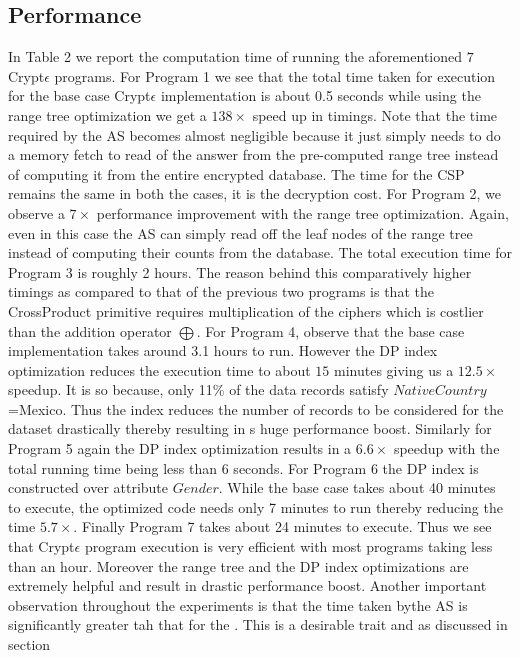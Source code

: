 \subsection{Performance}
In Table 2 we report the computation time of running the aforementioned $7$ Crypt$\epsilon$ programs. For Program 1 we see that the total time taken for execution for the base case Crypt$\epsilon$ implementation is about 0.5 seconds while using the range tree optimization we get a $138\times$ speed up in timings. Note that the time required by the \textsf{AS} becomes almost negligible because it just simply needs to do a memory fetch to read of the answer from the pre-computed range tree instead of computing it from the entire encrypted database. The time for the \textsf{CSP} remains the same in both the cases, it is the decryption cost. For Program 2, we observe a $7\times$ performance improvement with the range tree optimization. Again, even in this case the \textsf{AS} can simply read off the leaf nodes of the range tree instead of computing their counts from the database. The total execution time for Program 3 is roughly 2 hours.  The reason behind this comparatively higher timings as compared to that of the previous two programs is that the \textsf{CrossProduct} primitive requires  multiplication of the ciphers  which is costlier than the addition operator $\bigoplus$. For Program 4, observe that the base case implementation takes around 3.1 hours to run. However the DP index optimization reduces the execution time to about $15$ minutes  giving us a $12.5\times $ speedup. It is so because, only 11\% of the data records satisfy $NativeCountry$=Mexico. Thus the index reduces the number of records to be considered for the dataset drastically thereby resulting in s huge performance boost. Similarly for Program 5 again the DP index optimization results in a $6.6\times$ speedup with the total running time being less than 6 seconds. For Program 6 the DP index is constructed over attribute $Gender$. While the base case takes about 40 minutes to execute, the optimized code needs only 7 minutes to run thereby reducing the time  $5.7\times$. Finally Program 7 takes about 24 minutes to execute. Thus we see that Crypt$\epsilon$ program execution is very efficient with most programs taking less than an hour. Moreover the range tree and the DP index optimizations are extremely helpful and result in drastic performance boost. Another important observation throughout the experiments is that the time taken bythe AS is significantly greater tah that for the . This is a desirable trait and as discussed in section 
